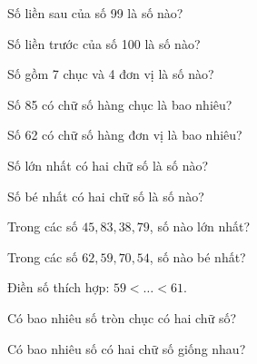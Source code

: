 \begin{ex}
Số liền sau của số 99 là số nào?
\end{ex}

\begin{ex}
Số liền trước của số 100 là số nào?
\end{ex}

\begin{ex}
Số gồm 7 chục và 4 đơn vị là số nào?
\end{ex}

\begin{ex}
Số 85 có chữ số hàng chục là bao nhiêu?
\end{ex}

\begin{ex}
Số 62 có chữ số hàng đơn vị là bao nhiêu?
\end{ex}

\begin{ex}
Số lớn nhất có hai chữ số là số nào?
\end{ex}

\begin{ex}
Số bé nhất có hai chữ số là số nào?
\end{ex}

\begin{ex}
Trong các số $45, 83, 38, 79$, số nào lớn nhất?
\end{ex}

\begin{ex}
Trong các số $62, 59, 70, 54$, số nào bé nhất?
\end{ex}

\begin{ex}
Điền số thích hợp: $59 < \dots < 61$.
\end{ex}

\begin{ex}
Có bao nhiêu số tròn chục có hai chữ số?
\end{ex}

\begin{ex}
Có bao nhiêu số có hai chữ số giống nhau?
\end{ex}

